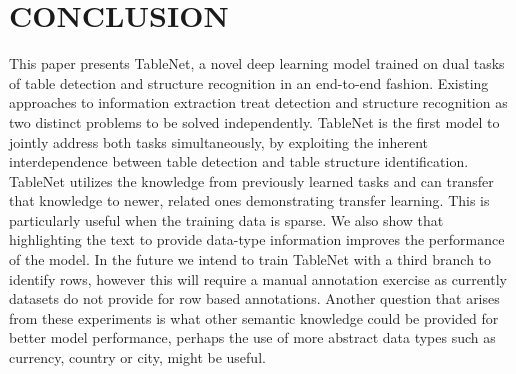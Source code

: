 \documentclass[conference]{IEEEtran}
\begin{document}
\section{CONCLUSION}
\label{sec:conc}
This paper presents TableNet, a novel deep learning model trained on dual tasks of table detection and structure recognition in an end-to-end fashion. Existing approaches to information extraction treat detection and structure recognition  as two distinct problems to be solved independently. TableNet is the first model to jointly address both tasks simultaneously, by exploiting the inherent interdependence between table detection and table structure identification. TableNet utilizes the knowledge from previously learned tasks and can transfer that knowledge to newer, related ones demonstrating transfer learning. This is particularly useful when the training data is sparse. We also show that highlighting the text to provide data-type information improves the performance of the model. In the future we intend to train TableNet with a third branch to identify rows, however this will require a manual annotation exercise as currently datasets do not provide for row based annotations. Another question that arises from these experiments is what other semantic knowledge could be provided for better model performance, perhaps the use of more abstract data types such as currency, country or city,  might be useful.  



\end{document}
